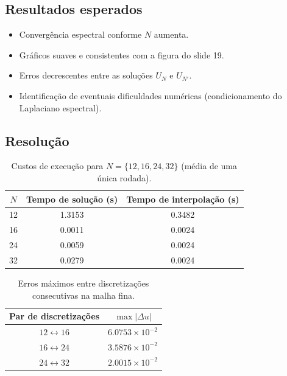 \documentclass[12pt,a4paper]{article}
\begin{document}
\subsection{Resultados esperados}

\begin{itemize}
    \item Convergência espectral conforme $N$ aumenta.
    \item Gráficos suaves e consistentes com a figura do slide 19.
    \item Erros decrescentes entre as soluções $U_{N}$ e $U_{N'}$.
    \item Identificação de eventuais dificuldades numéricas (condicionamento do Laplaciano espectral).
\end{itemize}

\subsection{Resolução}

\begin{table}[H]
    \centering
    \caption{Custos de execução para $N=\{12,16,24,32\}$ (média de uma única rodada).}
    \label{tab:tempo_poisson}
    \begin{tabular}{c c c}
        \toprule
        $N$ & Tempo de solução (s) & Tempo de interpolação (s) \\
        \midrule
        12 & 1.3153 & 0.3482 \\
        16 & 0.0011 & 0.0024 \\
        24 & 0.0059 & 0.0024 \\
        32 & 0.0279 & 0.0024 \\
        \bottomrule
    \end{tabular}
\end{table}

\begin{table}[H]
    \centering
    \caption{Erros máximos entre discretizações consecutivas na malha fina.}
    \label{tab:erro_poisson}
    \begin{tabular}{c c}
        \toprule
        Par de discretizações & $\max | \Delta u |$ \\
        \midrule
        $12 \leftrightarrow 16$ & $6.0753 \times 10^{-2}$ \\
        $16 \leftrightarrow 24$ & $3.5876 \times 10^{-2}$ \\
        $24 \leftrightarrow 32$ & $2.0015 \times 10^{-2}$ \\
        \bottomrule
    \end{tabular}
\end{table}
\end{document}
